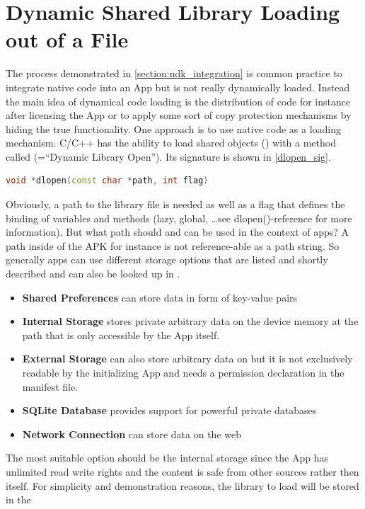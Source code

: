 \section{Dynamic Shared Library Loading out of a File}\label{section:shared_library_loading}
The process demonstrated in \autoref{section:ndk_integration} is common practice to
integrate native code into an App but is not really dynamically loaded. Instead
the main idea of dynamical code loading is the distribution of code for instance
after licensing the App or to apply some sort of copy protection mechanisms by hiding
the true functionality. One approach is to use native code as a loading mechanism.
C/C++ has the ability to load shared objects () with a method called
 (=``Dynamic Library Open''). Its signature is shown in \autoref{dlopen_sig}.
\begin{lstlisting}[language=C++, caption=dlopen() Signature, label=dlopen_sig]
void *dlopen(const char *path, int flag)
\end{lstlisting}
Obviously, a path to the library file is needed as well as a flag that defines the binding of variables and methods (lazy, global, \ldots see dlopen()-reference for more information).
But what path should and can be used in the context of apps? A path inside of the APK
for instance is not reference-able as a path string. So generally apps can use different storage options that are listed and shortly described and can also be looked up in
\parencite{storage_options}.
\begin{itemize}
\item \textbf{Shared Preferences} can store data in form of key-value pairs
\item \textbf{Internal Storage} stores private arbitrary data on the device memory at the path
  that is only accessible by the App itself.
\item \textbf{External Storage} can also store arbitrary data on  but it is not exclusively readable by the initializing App and needs a permission declaration in
the manifest file.
\item \textbf{SQLite Database} provides support for powerful private databases
\item \textbf{Network Connection} can store data on the web
\end{itemize}
The most suitable option should be the internal storage since the App has unlimited read
write rights and the content is safe from other sources rather then itself. For simplicity and demonstration reasons, the library to load will be stored in the
